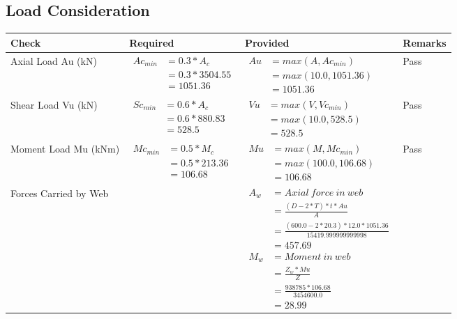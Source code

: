 \documentclass{article}%
\begin{document}
%
\newpage%
\subsection{Load Consideration}%
\label{subsec:LoadConsideration}%
\renewcommand{\arraystretch}{1.2}%
\begin{longtable}{|p{4cm}|p{5cm}|p{5.5cm}|p{1.5cm}|}%
\hline%
\rowcolor{OsdagGreen}%
Check&Required&Provided&Remarks\\%
\hline%
\endhead%
\hline%
Axial Load Au (kN)&$\begin{aligned} Ac_{min} &= 0.3 * A_c\\ &= 0.3 *3504.55\\ &=1051.36\end{aligned}$&$\begin{aligned} Au &= max(A,Ac_{min} )\\ &= max( 10.0,1051.36)\\ &=1051.36\end{aligned}$&Pass\\%
\hline%
Shear Load Vu (kN)&$\begin{aligned} Sc_{min} &= 0.6 * A_c\\ &= 0.6 *880.83\\ &=528.5\end{aligned}$&$\begin{aligned} Vu &= max(V,Vc_{min})\\ &=  max(10.0,528.5)\\ &=528.5\end{aligned}$&Pass\\%
\hline%
Moment Load Mu (kNm)&$\begin{aligned} Mc_{min} &= 0.5 * M_c\\ &= 0.5 *213.36\\ &=106.68\end{aligned}$&$\begin{aligned} Mu &= max(M,Mc_{min} )\\ &= max(100.0,106.68)\\ &=106.68\end{aligned}$&Pass\\%
\hline%
Forces Carried by Web&&$\begin{aligned}A_w &= Axial~ force~ in~ web  \\   &= \frac{(D- 2*T)*t* Au }{A} \\ &= \frac{(600.0- 2*20.3)*12.0*1051.36 }{15419.999999999998} \\ &=457.69\\ M_w &= Moment ~in ~web  \\  &= \frac{Z_w * Mu}{Z} \\ &= \frac{938785 * 106.68}{3454600.0} \\ &=28.99\end{aligned}$&\\%

\end{longtable}
\end{document}
